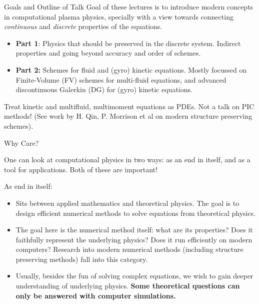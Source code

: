 \documentclass[aspectratio=43]{beamer}
\newcommand{\mypause}{\pause}
\begin{document}
\begin{frame}{Goals and Outline of Talk}
  Goal of these lectures is to introduce modern concepts in
  computational plasma physics, specially with a view towards
  connecting \emph{continuous} and \emph{discrete} properties of the
  equations.
  
  \mypause%
  \begin{itemize}
  \item {\bf Part 1}: Physics that should be preserved in the discrete
    system. Indirect properties and going beyond accuracy and order of
    schemes.
    \mypause%
  \item {\bf Part 2:} Schemes for fluid and (gyro) kinetic
    equations. Mostly focussed on Finite-Volume (FV) schemes for
    multi-fluid equations, and advanced discontinuous Galerkin (DG)
    for (gyro) kinetic equations.
  \end{itemize}
  \vskip0.1in%
  Treat kinetic and multifluid, multimoment equations as PDEs. Not a
  talk on PIC methods! (See work by H. Qin, P. Morrison et al on
  modern structure preserving schemes).
\end{frame}

\begin{frame}{Why Care?}

  One can look at computational physics in two ways: as an end in
  itself, and as a tool for applications. Both of these are important!

  \mypause%
  As end in itself:
  \begin{itemize}
  \item Sits between applied mathematics and theoretical physics. The
    goal is to design efficient numerical methods to solve equations
    from theoretical physics.
    \mypause%
  \item The goal here is the numerical method itself: what are its
    properties? Does it faithfully represent the underlying physics?
    Does it run efficiently on modern computers? Research into modern
    numerical methods (including structure preserving methods) fall
    into this category.
    \mypause%
  \item Usually, besides the fun of solving complex equations, we wish
    to gain deeper understanding of underlying physics. {\bf Some
      theoretical questions can only be answered with computer
      simulations.}
  \end{itemize}
  
\end{frame}
\end{document}
